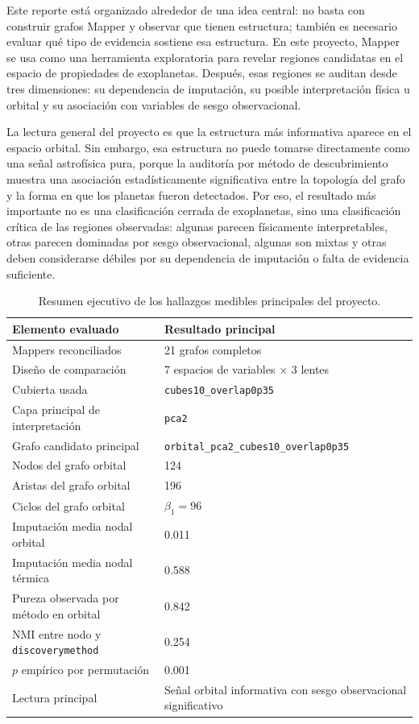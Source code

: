 Este reporte está organizado alrededor de una idea central: no basta con construir grafos Mapper y observar que tienen estructura; también es necesario evaluar qué tipo de evidencia sostiene esa estructura. En este proyecto, Mapper se usa como una herramienta exploratoria para revelar regiones candidatas en el espacio de propiedades de exoplanetas. Después, esas regiones se auditan desde tres dimensiones: su dependencia de imputación, su posible interpretación física u orbital y su asociación con variables de sesgo observacional.

La lectura general del proyecto es que la estructura más informativa aparece en el espacio orbital. Sin embargo, esa estructura no puede tomarse directamente como una señal astrofísica pura, porque la auditoría por método de descubrimiento muestra una asociación estadísticamente significativa entre la topología del grafo y la forma en que los planetas fueron detectados. Por eso, el resultado más importante no es una clasificación cerrada de exoplanetas, sino una clasificación crítica de las regiones observadas: algunas parecen físicamente interpretables, otras parecen dominadas por sesgo observacional, algunas son mixtas y otras deben considerarse débiles por su dependencia de imputación o falta de evidencia suficiente.

\begin{table}[H]
\centering
\small
\begin{tabular}{p{}p{}}
\toprule
\textbf{Elemento evaluado} & \textbf{Resultado principal} \\
\midrule
Mappers reconciliados & 21 grafos completos \\
Diseño de comparación & 7 espacios de variables $\times$ 3 lentes \\
Cubierta usada & \texttt{cubes10\_overlap0p35} \\
Capa principal de interpretación & \texttt{pca2} \\
Grafo candidato principal & \texttt{orbital\_pca2\_cubes10\_overlap0p35} \\
Nodos del grafo orbital & 124 \\
Aristas del grafo orbital & 196 \\
Ciclos del grafo orbital & $\beta_1=96$ \\
Imputación media nodal orbital & 0.011 \\
Imputación media nodal térmica & 0.588 \\
Pureza observada por método en orbital & 0.842 \\
NMI entre nodo y \texttt{discoverymethod} & 0.254 \\
$p$ empírico por permutación & 0.001 \\
Lectura principal & Señal orbital informativa con sesgo observacional significativo \\
\bottomrule
\end{tabular}
\caption{Resumen ejecutivo de los hallazgos medibles principales del proyecto.}
\label{tab:executive_summary}
\end{table}

